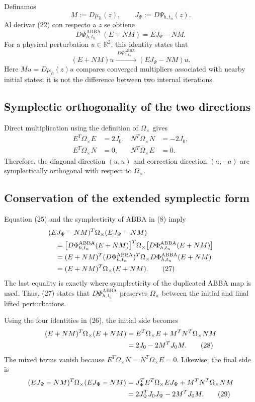 \documentclass[11pt,a4paper]{article}
\newcommand{\R}{\mathbb{R}}
\newcommand{\Om}{\Omega_{\times}}
\newcommand{\PhiAB}{\Phi^{\mathrm{ABBA}}_{h,t_n}}
\begin{document}
Definamos
\[
 M:=D\mu_h(z),
 \qquad
 J_\Psi:=D\Psi_{h,t_n}(z).
\]
Al derivar (22) con respecto a $z$ se obtiene
\[
 \boxed{
 D\PhiAB\,(E+NM)=EJ_\Psi-NM.
 } \tag{25}
\]
For a physical perturbation $u\in\R^2$, this identity states that
\[
 (E+NM)u
 \xrightarrow{\;D\PhiAB\;}
 (EJ_\Psi-NM)u.
\]
Here $Mu=D\mu_h(z)u$ compares converged multipliers associated with nearby initial states;
it is not the difference between two internal iterations.

\subsection{Symplectic orthogonality of the two directions}

Direct multiplication using the definition of $\Om$ gives
\[
 \boxed{
 \begin{aligned}
 E^T\Om E&=2J_0,
 &N^T\Om N&=-2J_0,\\
 E^T\Om N&=0,
 &N^T\Om E&=0.
 \end{aligned}
 } \tag{26}
\]
Therefore, the diagonal direction $(u,u)$ and correction direction $(a,-a)$ are
symplectically orthogonal with respect to $\Om$.

\subsection{Conservation of the extended symplectic form}

Equation (25) and the symplecticity of ABBA in (8) imply
\begin{align}
 &(EJ_\Psi-NM)^T\Om(EJ_\Psi-NM) \notag\\
 &\quad=\bigl[D\PhiAB(E+NM)\bigr]^T
          \Om
          \bigl[D\PhiAB(E+NM)\bigr] \notag\\
 &\quad=(E+NM)^T
          (D\PhiAB)^T\Om D\PhiAB
          (E+NM) \notag\\
 &\quad=(E+NM)^T\Om(E+NM). \tag{27}
\end{align}
The last equality is exactly where symplecticity of the duplicated ABBA map is used.
Thus, (27) states that $D\PhiAB$ preserves $\Om$ between the initial and final lifted perturbations.

Using the four identities in (26), the initial side becomes
\begin{align}
 (E+NM)^T\Om(E+NM)
 &=E^T\Om E+M^TN^T\Om NM \notag\\
 &=2J_0-2M^TJ_0M. \tag{28}
\end{align}
The mixed terms vanish because $E^T\Om N=N^T\Om E=0$. Likewise, the final side is
\begin{align}
 (EJ_\Psi-NM)^T\Om(EJ_\Psi-NM)
 &=J_\Psi^TE^T\Om EJ_\Psi+M^TN^T\Om NM \notag\\
 &=2J_\Psi^TJ_0J_\Psi-2M^TJ_0M. \tag{29}
\end{align}
\end{document}
